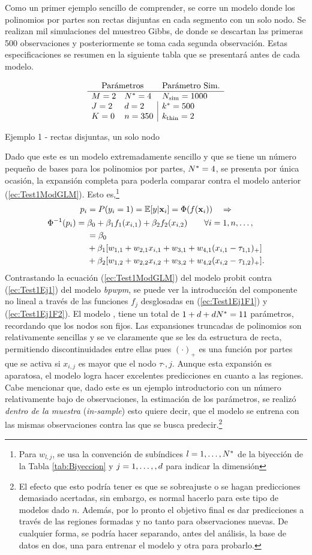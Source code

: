 \documentclass[../Main/Main.tex]{subfiles}
\begin{document}
Como un primer ejemplo sencillo de comprender, se corre un modelo donde los polinomios por partes son rectas disjuntas en cada segmento con un solo nodo. Se realizan mil simulaciones del muestreo Gibbs, de donde se descartan las primeras 500 observaciones y posteriormente se toma cada segunda observación. Estas especificaciones se resumen en la siguiente tabla que se presentará antes de cada modelo. 
\begin{table}[H]
$$\paramsmod{2}{2}{0}{4}{2}{350}{1000}{500}{2}$$
\caption{Ejemplo 1 - rectas disjuntas, un solo nodo}
\label{ej:1}
\end{table}
Dado que este es un modelo extremadamente sencillo y que se tiene un número pequeño de bases para los polinomios por partes, $N^* = 4$, se presenta por única ocasión, la expansión completa para poderla comparar contra el modelo anterior (\ref{ec:Test1ModGLM}). Esto es,\footnote{Para $w_{l,j}$, se usa la convención de subíndices $l = 1,\ldots,N^*$ de la biyección de la Tabla \ref{tab:Biyeccion} y $j = 1,\ldots,,{d}$ para indicar la dimensión}
\begin{align}
	p_i &= P(y_i = 1) =\mathbb{E}[y|\mathbf{x}_i] = \Phi(f(\mathbf{x}_i))  \quad \Rightarrow  			\nonumber \\
	\Phi^{-1}(p_i) = \;&\beta_0 + \beta_1f_1(x_{i,1}) + \beta_2f_2(x_{i,2}) 
	\qquad 	\forall i = 1,n,\ldots,\label{ec:Test1Ej1} \\
	&= \beta_0 \nonumber \\
	&+ \beta_1[w_{1,1} + w_{2,1}x_{i,1} + w_{3,1} + w_{4,1}(x_{i,1} - \tau_{1,1})_+] \label{ec:Test1Ej1F1}\\
	& +\beta_2[w_{1,2} + w_{2,2}x_{i,2} + w_{3,2} + w_{4,2}(x_{i,2} - \tau_{1,2})_+]. \label{ec:Test1Ej1F2}
\end{align}
Contrastando la ecuación (\ref{ec:Test1ModGLM}) del modelo probit  contra (\ref{ec:Test1Ej1}) del modelo \textit{bpwpm}, se puede ver la introducción del componente no lineal a través de las funciones $f_j$ desglosadas en (\ref{ec:Test1Ej1F1}) y (\ref{ec:Test1Ej1F2}). El modelo , tiene un total de $1 + d + dN^* = 11$ parámetros, recordando que los nodos son fijos. Las expansiones truncadas de polinomios son relativamente sencillas y se ve claramente que se les da estructura de recta, permitiendo discontinuidades entre ellas pues $(\cdot)_+$ es una función por partes que se activa si $x_{i,j}$ es mayor que el nodo $\tau{\cdot,j}$. Aunque esta expansión es aparatosa, el modelo logra hacer excelentes predicciones en cuanto a las regiones. Cabe mencionar que, dado este es un ejemplo introductorio con un número relativamente bajo de observaciones, la estimación de los parámetros, se realizó \textit{dentro de la muestra} (\textit{in-sample}) esto quiere decir, que el modelo se entrena con las mismas observaciones contra las que se busca predecir.\footnote{El efecto que esto podría tener es que se sobreajuste o se hagan predicciones demasiado acertadas, sin embargo, es normal hacerlo para este tipo de modelos dado $n$. Además, por lo pronto el objetivo final es dar predicciones a través de las regiones formadas y no tanto para observaciones nuevas. De cualquier forma, se podría hacer separando, antes del análisis, la base de datos en dos, una para entrenar el modelo y otra para probarlo.} 
\end{document}
